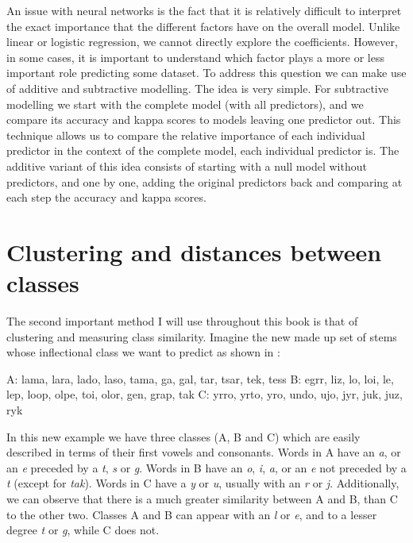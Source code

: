 An issue with neural networks is the fact that it is relatively difficult to interpret the exact importance that the different factors have on the overall model. Unlike linear or logistic regression, we cannot directly explore the coefficients. However, in some cases, it is important to understand which factor plays a more or less important role predicting some dataset. To address this question we can make use of additive and subtractive modelling. The idea is very simple. For subtractive modelling we start with the complete model (with all predictors), and we compare its accuracy and kappa scores to models leaving one predictor out. This technique allows us to compare the relative importance of each individual predictor in the context of the complete model, each individual predictor is. The additive variant of this idea consists of starting with a null model without predictors, and one by one, adding the original predictors back and comparing at each step the accuracy and kappa scores.

\section{Clustering and distances between classes}


The second important method I will use throughout this book is that of clustering and measuring class similarity. Imagine the new made up set of stems whose inflectional class we want to predict as shown in :

\begin{exe}
    \ex \label{inf-class-2}
    \begin{xlist}
        \ex A: lama, lara, lado, laso, tama, ga, gal, tar, tsar, tek, tess
        \ex B: egrr, liz, lo, loi, le, lep, loop, olpe, toi, olor, gen, grap, tak
        \ex C: yrro, yrto, yro, undo, ujo, jyr, juk, juz, ryk
    \end{xlist}
\end{exe}

In this new example we have three classes (A, B and C) which are easily described in terms of their first vowels and consonants. Words in A have an \textit{a}, or an \textit{e} preceded by a \textit{t}, \textit{s} or \textit{g}. Words in B have an \textit{o}, \textit{i}, \textit{a}, or an \textit{e} not preceded by a \textit{t} (except for \textit{tak}). Words in C have a \textit{y} or \textit{u}, usually with an \textit{r} or \textit{j}. Additionally, we can observe that there is a much greater similarity between A and B, than C to the other two. Classes A and B can appear with an \textit{l} or \textit{e}, and to a lesser degree \textit{t} or \textit{g}, while C does not.

